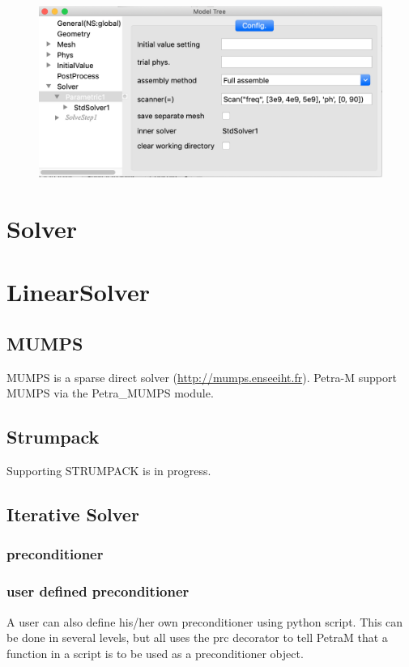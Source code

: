 \documentclass[11pt,a4paper,final]{report}
\begin{document}
\begin{figure}
\centering
\includegraphics[width=0.95\columnwidth]{figures/parametric_scan.png} 
\caption{  }\label{parametric_scan}
\end{figure}

\section{Solver}

\section{LinearSolver}
\subsection{MUMPS}
MUMPS is a sparse direct solver (\url{http://mumps.enseeiht.fr}). Petra-M support MUMPS via the Petra\_MUMPS module. 

\subsection{Strumpack}
Supporting STRUMPACK is in progress.

\subsection{Iterative Solver}
\subsubsection{preconditioner}


\subsubsection{user defined preconditioner}
A user can also define his/her own preconditioner using python script.  This can be done in several levels, but all
uses the prc decorator to tell PetraM that a function in a script is to be used as a preconditioner object.
\end{document}
